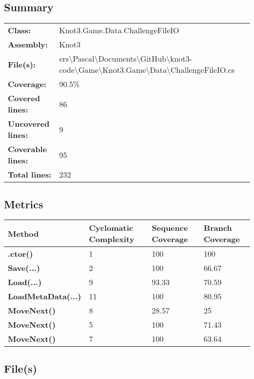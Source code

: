 \documentclass[a4paper,10pt]{article}
\begin{document}
\subsection{Summary}
\begin{longtable}[l]{ll}
\textbf{Class:} & Knot3.Game.Data.ChallengeFileIO\\
\textbf{Assembly:} & Knot3\\
\textbf{File(s):} & \begin{minipage}[t]{12cm}{ers\textbackslash Pascal\textbackslash Documents\textbackslash GitHub\textbackslash knot3-code\textbackslash Game\textbackslash Knot3.Game\textbackslash Data\textbackslash ChallengeFileIO.cs}\end{minipage} \\
\textbf{Coverage:} & 90.5\%\\
\textbf{Covered lines:} & 86\\
\textbf{Uncovered lines:} & 9\\
\textbf{Coverable lines:} & 95\\
\textbf{Total lines:} & 232\\
\end{longtable}
\subsection{Metrics}
\begin{longtable}[l]{|l|l|l|l|}
\hline
\textbf{Method} & \textbf{Cyclomatic Complexity} & \textbf{Sequence Coverage} & \textbf{Branch Coverage}\\
\hline
\textbf{.ctor()} & 1 & 100 & 100\\
\hline
\textbf{Save(...)} & 2 & 100 & 66.67\\
\hline
\textbf{Load(...)} & 9 & 93.33 & 70.59\\
\hline
\textbf{LoadMetaData(...)} & 11 & 100 & 80.95\\
\hline
\textbf{MoveNext()} & 8 & 28.57 & 25\\
\hline
\textbf{MoveNext()} & 5 & 100 & 71.43\\
\hline
\textbf{MoveNext()} & 7 & 100 & 63.64\\
\hline
\end{longtable}
\subsection{File(s)}
\end{document}
